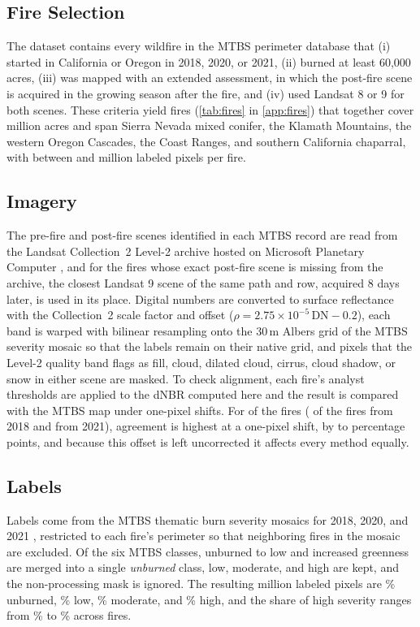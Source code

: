 \documentclass[10pt]{article}
\begin{document}
\subsection{Fire Selection}
The dataset contains every wildfire in the MTBS perimeter database that (i) started in California or Oregon in 2018, 2020, or 2021, (ii) burned at least 60{,}000 acres, (iii) was mapped with an extended assessment, in which the post-fire scene is acquired in the growing season after the fire, and (iv) used Landsat 8 or 9 for both scenes.
These criteria yield \mFires{} fires (\cref{tab:fires} in \cref{app:fires}) that together cover \mAcresM{} million acres and span Sierra Nevada mixed conifer, the Klamath Mountains, the western Oregon Cascades, the Coast Ranges, and southern California chaparral, with between \aPxMin{} and \aPxMax{} million labeled pixels per fire.

\subsection{Imagery}
The pre-fire and post-fire scenes identified in each MTBS record are read from the Landsat Collection~2 Level-2 archive \citep{usgs2026landsatc2} hosted on Microsoft Planetary Computer \citep{planetarycomputer}, and for the \mSubstituted{} fires whose exact post-fire scene is missing from the archive, the closest Landsat 9 scene of the same path and row, acquired 8 days later, is used in its place.
Digital numbers are converted to surface reflectance with the Collection~2 scale factor and offset ($\rho = 2.75 \times 10^{-5}\,\mathrm{DN} - 0.2$), each band is warped with bilinear resampling onto the 30\,m Albers grid of the MTBS severity mosaic so that the labels remain on their native grid, and pixels that the Level-2 quality band flags as fill, cloud, dilated cloud, cirrus, cloud shadow, or snow in either scene are masked.
To check alignment, each fire's analyst thresholds are applied to the dNBR computed here and the result is compared with the MTBS map under one-pixel shifts.
For \aAlignShifted{} of the \mFires{} fires (\aAlignShiftedEighteen{} of the \aAlignNEighteen{} fires from 2018 and \aAlignShiftedTwentyOne{} from 2021), agreement is highest at a one-pixel shift, by \aAlignGainMin{} to \aAlignGainMax{} percentage points, and because this offset is left uncorrected it affects every method equally.

\subsection{Labels}
Labels come from the MTBS thematic burn severity mosaics for 2018, 2020, and 2021 \citep{mtbs2024mosaics}, restricted to each fire's perimeter so that neighboring fires in the mosaic are excluded.
Of the six MTBS classes, unburned to low and increased greenness are merged into a single \emph{unburned} class, low, moderate, and high are kept, and the non-processing mask is ignored.
The resulting \mPixelsM{} million labeled pixels are \mShareUnburned\% unburned, \mShareLow\% low, \mShareModerate\% moderate, and \mShareHigh\% high, and the share of high severity ranges from \aHighShareMin\% to \aHighShareMax\% across fires.
\end{document}
